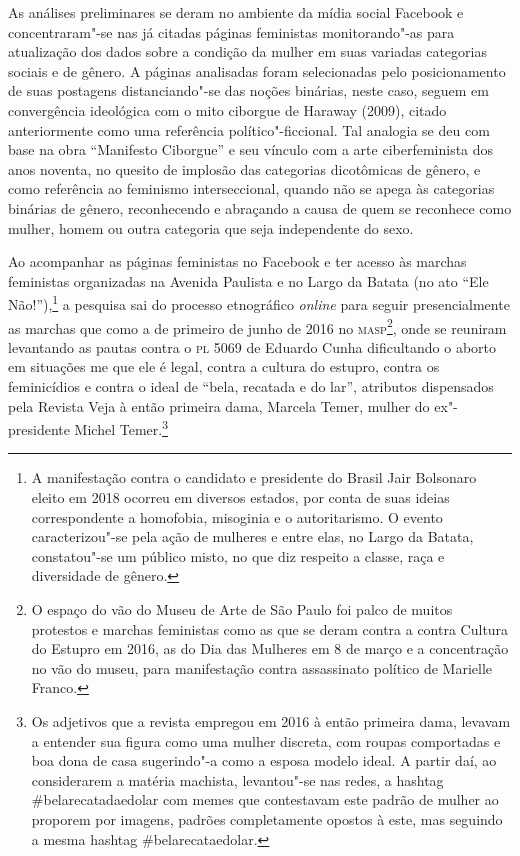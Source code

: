 As análises preliminares se deram no ambiente da mídia social Facebook e
concentraram"-se nas já citadas páginas feministas monitorando"-as para
atualização dos dados sobre a condição da mulher em suas variadas
categorias sociais e de gênero. A páginas analisadas foram selecionadas
pelo posicionamento de suas postagens distanciando"-se das noções
binárias, neste caso, seguem em convergência ideológica com o mito
ciborgue de Haraway (2009), citado anteriormente como uma referência
político"-ficcional. Tal analogia se deu com base na obra ``Manifesto
Ciborgue'' e seu vínculo com a arte ciberfeminista dos anos noventa, no
quesito de implosão das categorias dicotômicas de gênero, e como
referência ao feminismo interseccional, quando não se apega às
categorias binárias de gênero, reconhecendo e abraçando a causa de quem
se reconhece como mulher, homem ou outra categoria que seja independente
do sexo.

Ao acompanhar as páginas feministas no Facebook e ter acesso às marchas
feministas organizadas na Avenida Paulista e no Largo da Batata (no ato
``Ele Não!''),\footnote{A manifestação contra o candidato e presidente do
  Brasil Jair Bolsonaro eleito em 2018 ocorreu em diversos estados, por
  conta de suas ideias correspondente a homofobia, misoginia e o
  autoritarismo. O evento caracterizou"-se pela ação de mulheres e entre
  elas, no Largo da Batata, constatou"-se um público misto, no que diz
  respeito a classe, raça e diversidade de gênero.} a pesquisa sai
do processo etnográfico \emph{online} para seguir presencialmente as marchas
que como a de primeiro de junho de 2016 no \textsc{masp}\footnote{O espaço do vão
  do Museu de Arte de São Paulo foi palco de muitos protestos e marchas
  feministas como as que se deram contra a contra Cultura do Estupro em
  2016, as do Dia das Mulheres em 8 de março e a concentração no vão do
  museu, para manifestação contra assassinato político de Marielle
  Franco.}, onde se reuniram levantando as pautas contra o \textsc{pl} 5069 de
Eduardo Cunha dificultando o aborto em situações me que ele é legal,
contra a cultura do estupro, contra os feminicídios e contra o ideal de
``bela, recatada e do lar'', atributos dispensados pela Revista Veja à
então primeira dama, Marcela Temer, mulher do ex"-presidente Michel
Temer.\footnote{Os adjetivos que a revista empregou em 2016 à então
  primeira dama, levavam a entender sua figura como uma mulher discreta,
  com roupas comportadas e boa dona de casa sugerindo"-a como a esposa
  modelo ideal. A partir daí, ao considerarem a matéria machista,
  levantou"-se nas redes, a hashtag \#belarecatadaedolar com memes que
  contestavam este padrão de mulher ao proporem por imagens, padrões
  completamente opostos à este, mas seguindo a mesma hashtag
  \#belarecataedolar.}

